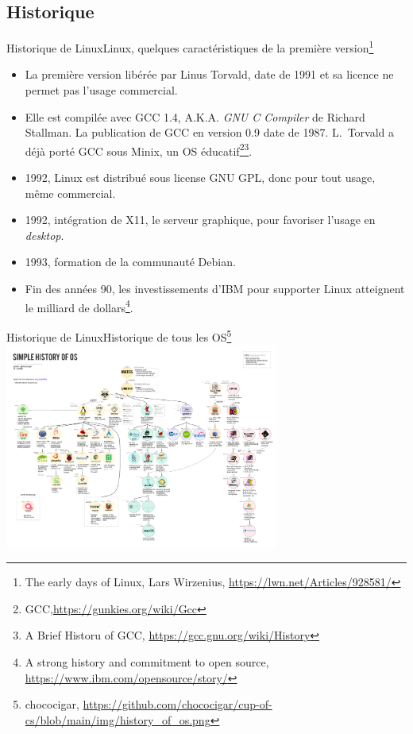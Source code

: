 \documentclass{beamer}
\begin{document}
    \subsection{Historique}\label{subsec:historique}

    \begin{frame}{Historique de Linux}{Linux, quelques caractéristiques de la première version\footnote{The early days of Linux, Lars Wirzenius, \url{https://lwn.net/Articles/928581/}}}
        \begin{footnotesize}
            \begin{itemize}
                \item La première version libérée par Linus Torvald, date de 1991 et sa licence ne permet pas l'usage commercial.
                \item Elle est compilée avec GCC 1.4, A.K.A. \textit{GNU C Compiler} de Richard Stallman.
                La publication de GCC en version 0.9 date de 1987.
                L.~Torvald a déjà porté GCC sous Minix, un OS éducatif\footnote{GCC,\url{https://gunkies.org/wiki/Gcc}}\footnotestep\footnote{A Brief Historu of GCC, \url{https://gcc.gnu.org/wiki/History}}.
                \item 1992, Linux est distribué sous license GNU GPL, donc pour tout usage, même commercial.
                \item 1992, intégration de X11, le serveur graphique, pour favoriser l'usage en \textit{desktop}.
                \item 1993, formation de la communauté Debian.
                \item Fin des années 90, les investissements d'IBM pour supporter Linux atteignent le milliard de dollars\footnote{A strong history and commitment to open source, \url{https://www.ibm.com/opensource/story/}}.
            \end{itemize}
        \end{footnotesize}
    \end{frame}

    \begin{frame}{Historique de Linux}{Historique de tous les OS\footnote{chococigar, \url{https://github.com/chococigar/cup-of-cs/blob/main/img/history\_of\_os.png}}}
        \centering
        \includegraphics[width=9cm]{image/history_of_os}
    \end{frame}
\end{document}
